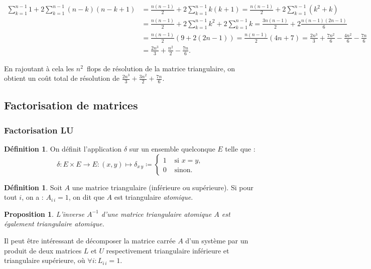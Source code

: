 \documentclass{article}
\newtheorem{prp}[thm]{Proposition}
\theoremstyle{definition}
\newtheorem{déf}[thm]{Définition}
\theoremstyle{remark}
\begin{document}
		\begin{align*}
			\sum_{k=1}^{n-1}1 + 2\sum_{k=1}^{n-1}(n-k)(n-k+1) &= \frac {n(n-1)}2 + 2\sum_{k=1}^{n-1}k(k+1) = \frac {n(n-1)}2 + 2\sum_{k=1}^{n-1}(k^2 + k) \\
			&= \frac {n(n-1)}2 + 2\sum_{k=1}^{n-1}k^2 + 2\sum_{k=1}^{n-1}k = \frac {3n(n-1)}2 + 2\frac {n(n-1)(2n-1)}6 \\
			&= \frac {n(n-1)}2\left(9 + 2(2n-1)\right) = \frac {n(n-1)}2(4n+7) = \frac {2n^3}3 + \frac {7n^2}6 - \frac {4n^2}6 - \frac {7n}6 \\
			&= \frac {2n^3}3 + \frac {n^2}2 - \frac {7n}6.
		\end{align*}

		En rajoutant à cela les $n^2$~flops de résolution de la matrice triangulaire, on obtient un coût total de résolution de
		$\frac {2n^3}3 + \frac {3n^2}2 + \frac {7n}6$.
	
	\subsection{Factorisation de matrices}
		\subsubsection{Factorisation LU}
		\begin{déf} On définit l'application $\delta$ sur un ensemble quelconque $E$ telle que :
		\[\delta : E \times E \to E : (x, y) \mapsto \delta_{x\,y} \coloneqq \begin{cases}1 &\text{ si }x = y, \\0 &\text{ sinon}.\end{cases}\]
		\end{déf}

		\begin{déf} Soit $A$ une matrice triangulaire (inférieure ou supérieure). Si pour tout $i$, on a : $A_{i\,i} = 1$, on dit que $A$ est triangulaire
		\emph{atomique}.
		\end{déf}

		\begin{prp} L'inverse $A^{-1}$ d'une matrice triangulaire atomique $A$ est également triangulaire atomique. \end{prp}

		Il peut être intéressant de décomposer la matrice carrée $A$ d'un système par un produit de deux matrices $L$ et $U$ respectivement triangulaire
		inférieure et triangulaire supérieure, où $\forall i : L_{i\,i} = 1$.
\end{document}
